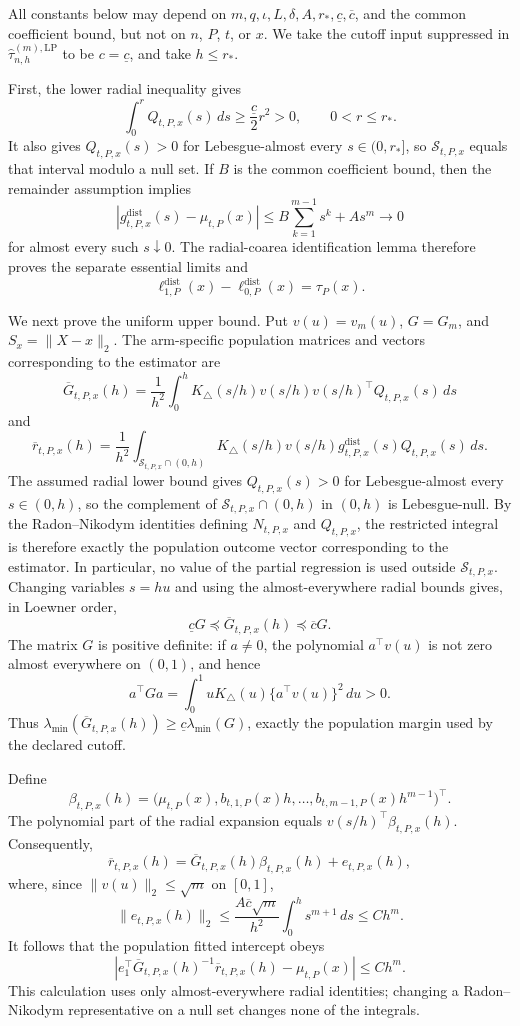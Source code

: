 All constants below may depend on \(m,q,\iota,L,\delta,A,r_*,\underline c,\overline c\), and the common coefficient bound, but not on \(n\), \(P\), \(t\), or \(x\).  We take the cutoff input suppressed in \(\widehat\tau^{(m),\mathrm{LP}}_{n,h}\) to be \(c=\underline c\), and take \(h\leq r_*\).

First, the lower radial inequality gives
\[
 \int_0^rQ_{t,P,x}(s)\,ds\geq\frac{\underline c}{2}r^2>0,
 \qquad 0<r\leq r_*.
\]
It also gives \(Q_{t,P,x}(s)>0\) for Lebesgue-almost every \(s\in(0,r_*]\), so \(\mathcal S_{t,P,x}\) equals that interval modulo a null set.  If \(B\) is the common coefficient bound, then the remainder assumption implies
\[
 |g^{\mathrm{dist}}_{t,P,x}(s)-\mu_{t,P}(x)|
 \leq B\sum_{k=1}^{m-1}s^k+As^m\longrightarrow0
\]
for almost every such \(s\downarrow0\).  The radial-coarea identification lemma therefore proves the separate essential limits and
\[
 \ell^{\mathrm{dist}}_{1,P}(x)-\ell^{\mathrm{dist}}_{0,P}(x)=\tau_P(x).
\]

We next prove the uniform upper bound.  Put \(v(u)=v_m(u)\), \(G=G_m\), and \(S_x=\lVert X-x\rVert_2\).  The arm-specific population matrices and vectors corresponding to the estimator are
\[
 \overline G_{t,P,x}(h)
 =\frac1{h^2}\int_0^hK_\triangle(s/h)v(s/h)v(s/h)^\top
 Q_{t,P,x}(s)\,ds
\]
and
\[
 \overline r_{t,P,x}(h)
 =\frac1{h^2}\int_{\mathcal S_{t,P,x}\cap(0,h)}
 K_\triangle(s/h)v(s/h)
 g^{\mathrm{dist}}_{t,P,x}(s)Q_{t,P,x}(s)\,ds.
\]
The assumed radial lower bound gives \(Q_{t,P,x}(s)>0\) for Lebesgue-almost every \(s\in(0,h)\), so the complement of \(\mathcal S_{t,P,x}\cap(0,h)\) in \((0,h)\) is Lebesgue-null.  By the Radon--Nikodym identities defining \(N_{t,P,x}\) and \(Q_{t,P,x}\), the restricted integral is therefore exactly the population outcome vector corresponding to the estimator.  In particular, no value of the partial regression is used outside \(\mathcal S_{t,P,x}\).  Changing variables \(s=hu\) and using the almost-everywhere radial bounds gives, in Loewner order,
\[
 \underline cG\preceq\overline G_{t,P,x}(h)
 \preceq\overline cG.
\]
The matrix \(G\) is positive definite: if \(a\neq0\), the polynomial \(a^\top v(u)\) is not zero almost everywhere on \((0,1)\), and hence
\[
 a^\top Ga=\int_0^1uK_\triangle(u)\{a^\top v(u)\}^2\,du>0.
\]
Thus \(\lambda_{\min}(\overline G_{t,P,x}(h))\geq\underline c\lambda_{\min}(G)\), exactly the population margin used by the declared cutoff.

Define
\[
 \beta_{t,P,x}(h)
 =\bigl(\mu_{t,P}(x),b_{t,1,P}(x)h,\ldots,
 b_{t,m-1,P}(x)h^{m-1}\bigr)^\top.
\]
The polynomial part of the radial expansion equals \(v(s/h)^\top\beta_{t,P,x}(h)\).  Consequently,
\[
 \overline r_{t,P,x}(h)
 =\overline G_{t,P,x}(h)\beta_{t,P,x}(h)+e_{t,P,x}(h),
\]
where, since \(\lVert v(u)\rVert_2\leq\sqrt m\) on \([0,1]\),
\[
 \lVert e_{t,P,x}(h)\rVert_2
 \leq\frac{A\overline c\sqrt m}{h^2}
 \int_0^h s^{m+1}\,ds
 \leq C h^m.
\]
It follows that the population fitted intercept obeys
\[
 \left|e_1^\top\overline G_{t,P,x}(h)^{-1}
 \overline r_{t,P,x}(h)-\mu_{t,P}(x)\right|
 \leq Ch^m.
\]
This calculation uses only almost-everywhere radial identities; changing a Radon--Nikodym representative on a null set changes none of the integrals.

